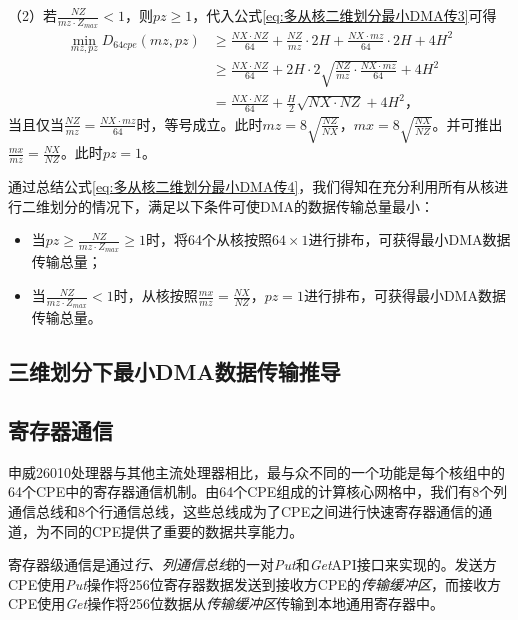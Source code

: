 \documentclass[degree=doctor]{thuthesis}
\begin{document}
（2）若$\frac{NZ}{mz\cdot Z_{max}} < 1$，则$pz\ge 1$，代入公式\ref{eq:多从核二维划分最小DMA传3}可得
\begin{equation}
\begin{aligned}
  \min_{mz,pz} D_{64cpe}(mz,pz) &\ge \frac{NX\cdot NZ}{64}+\frac{NZ}{mz}\cdot 2H+\frac{NX\cdot mz}{64} \cdot 2H + 4H^2 \\
  &\ge \frac{NX\cdot NZ}{64}+2H\cdot2\sqrt{\frac{NZ}{mz}\cdot\frac{NX\cdot mz}{64} } + 4H^2 \\
  &=\frac{NX\cdot NZ}{64}+\frac{H}{2}\sqrt{NX\cdot NZ}+ 4H^2
  ，
\end{aligned}
  \label{eq:多从核二维划分最小DMA传5}
\end{equation}
当且仅当$\frac{NZ}{mz}=\frac{NX\cdot mz}{64}$时，等号成立。此时$mz=8\sqrt{\frac{NZ}{NX}}$，$mx=8\sqrt{\frac{NX}{NZ}}$。并可推出$\frac{mx}{mz}=\frac{NX}{NZ}$。此时$pz=1$。

通过总结公式\ref{eq:多从核二维划分最小DMA传4}，我们得知在充分利用所有从核进行二维划分的情况下，满足以下条件可使DMA的数据传输总量最小：
\begin{itemize}
  \item 当$pz \ge \frac{NZ}{mz\cdot Z_{max}} \ge 1$时，将64个从核按照$64\times 1$进行排布，可获得最小DMA数据传输总量；
  \item 当$\frac{NZ}{mz\cdot Z_{max}} < 1$时，从核按照$\frac{mx}{mz}=\frac{NX}{NZ}，pz=1$进行排布，可获得最小DMA数据传输总量。
\end{itemize}


\subsection{三维划分下最小DMA数据传输推导} %
\label{sub:三维划分下最小DMA数据传输推导}



\subsection{寄存器通信}

申威26010处理器与其他主流处理器相比，最与众不同的一个功能是每个核组中的64个CPE中的寄存器通信机制。由64个CPE组成的计算核心网格中，我们有8个列通信总线和8个行通信总线，这些总线成为了CPE之间进行快速寄存器通信的通道，为不同的CPE提供了重要的数据共享能力。

寄存器级通信是通过\emph{行、列通信总线}的一对\emph{Put}和\emph{Get}API接口来实现的。发送方CPE使用\emph {Put}操作将256位寄存器数据发送到接收方CPE的\emph{传输缓冲区}，而接收方CPE使用\emph{Get}操作将256位数据从\emph{传输缓冲区}传输到本地通用寄存器中。
\end{document}
